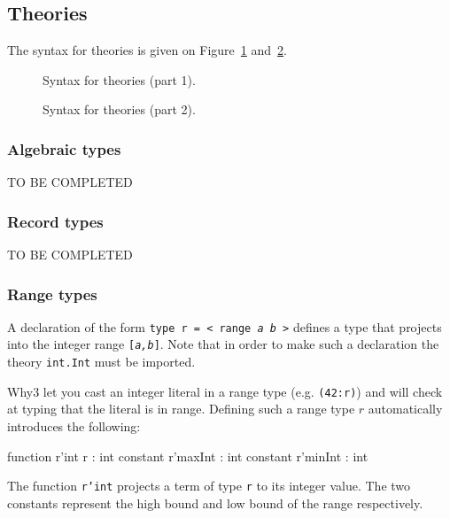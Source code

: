 \subsection{Theories}

The syntax for theories is given on Figure~\ref{fig:bnf:theorya} and~\ref{fig:bnf:theoryb}.

\begin{figure}
  \begin{center}\framebox{}\end{center}
  \caption{Syntax for theories (part 1).}
\label{fig:bnf:theorya}
\end{figure}

\begin{figure}
  \begin{center}\framebox{}\end{center}
  \caption{Syntax for theories (part 2).}
\label{fig:bnf:theoryb}
\end{figure}

\subsubsection{Algebraic types}

TO BE COMPLETED

\subsubsection{Record types}

TO BE COMPLETED

\subsubsection{Range types}
\label{sec:rangetypes}

A declaration of the form \texttt{type r = < range \textit{a b} >}
defines a type that projects into the integer range
\texttt{[\textit{a,b}]}. Note that in order to make such a declaration
the theory \texttt{int.Int} must be imported.

Why3 let you cast an integer literal in a range type
(e.g. \texttt{(42:r)}) and will check at typing that the literal is in
range. Defining such a range type $r$ automatically introduces the
following:
\begin{whycode}
  function  r'int r : int
  constant  r'maxInt : int
  constant  r'minInt : int
\end{whycode}
The function \texttt{r'int} projects a term of type \texttt{r} to its
integer value. The two constants represent the high bound and low
bound of the range respectively.

